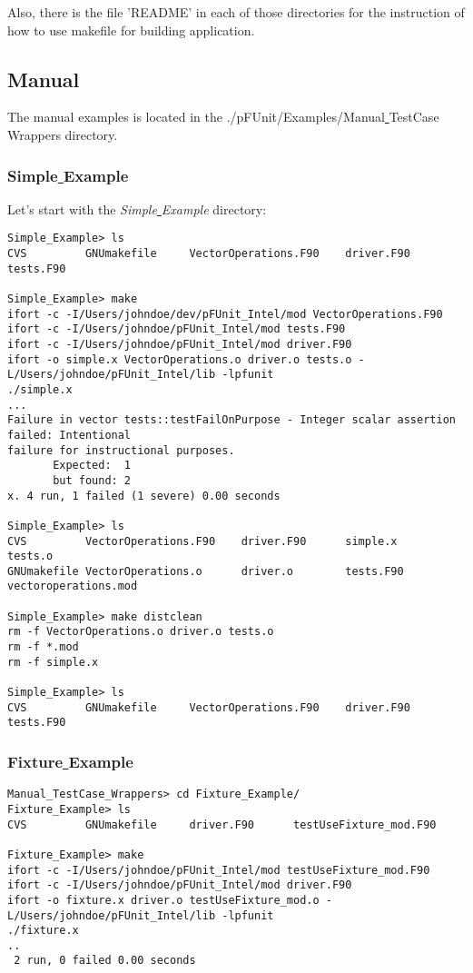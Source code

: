 \documentclass[10pt]{article}
\begin{document}
Also, there is the file 'README' in each of those directories for the instruction of how to use makefile for building application.


\subsection{Manual}
The manual examples is located in the ./pFUnit/Examples/Manual\underline{ }TestCase\underline{ }Wrappers directory.

\subsubsection{Simple\underline{ }Example}
Let's start with the \emph{Simple\underline{ }Example} directory:

{\small \begin{verbatim}
Simple_Example> ls
CVS			GNUmakefile		VectorOperations.F90	driver.F90		tests.F90

Simple_Example> make
ifort -c -I/Users/johndoe/dev/pFUnit_Intel/mod VectorOperations.F90
ifort -c -I/Users/johndoe/pFUnit_Intel/mod tests.F90
ifort -c -I/Users/johndoe/pFUnit_Intel/mod driver.F90
ifort -o simple.x VectorOperations.o driver.o tests.o -L/Users/johndoe/pFUnit_Intel/lib -lpfunit
./simple.x
...  
Failure in vector tests::testFailOnPurpose - Integer scalar assertion failed: Intentional 
failure for instructional purposes.
       Expected:  1
       but found: 2
x. 4 run, 1 failed (1 severe) 0.00 seconds

Simple_Example> ls
CVS			VectorOperations.F90	driver.F90		simple.x		tests.o
GNUmakefile	VectorOperations.o		driver.o		tests.F90		vectoroperations.mod

Simple_Example> make distclean
rm -f VectorOperations.o driver.o tests.o
rm -f *.mod
rm -f simple.x

Simple_Example> ls
CVS			GNUmakefile		VectorOperations.F90	driver.F90		tests.F90
\end{verbatim}
}


\subsubsection{Fixture\underline{ }Example}

{\small \begin{verbatim}
Manual_TestCase_Wrappers> cd Fixture_Example/
Fixture_Example> ls
CVS			GNUmakefile		driver.F90		testUseFixture_mod.F90

Fixture_Example> make
ifort -c -I/Users/johndoe/pFUnit_Intel/mod testUseFixture_mod.F90
ifort -c -I/Users/johndoe/pFUnit_Intel/mod driver.F90
ifort -o fixture.x driver.o testUseFixture_mod.o -L/Users/johndoe/pFUnit_Intel/lib -lpfunit
./fixture.x
..  
 2 run, 0 failed 0.00 seconds
 
\end{verbatim}
}
\end{document}

